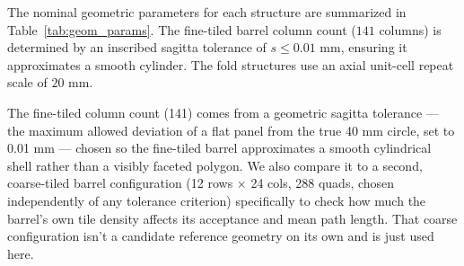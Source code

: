 \documentclass[a4paper,11pt]{article}
\begin{document}
The nominal geometric parameters for each structure are summarized in Table~\ref{tab:geom_params}. The fine-tiled barrel column count ($141$ columns) is determined by an inscribed sagitta tolerance of $s \le 0.01\text{ mm}$, ensuring it approximates a smooth cylinder. The fold structures use an axial unit-cell repeat scale of $20\text{ mm}$.

\begin{table}[!htbp]
\centering
\caption{Geometric parameters and material budget of the simulated structures at fixed $R = 40\text{ mm}$, $L = 120\text{ mm}$, $300\ \mu\text{m}$ Si, $50\ \mu\text{m}$ Kapton. Active area is the total mid-surface sensor area; $A_{\text{cyl}} = 2\pi R L = 301.59\text{ cm}^2$. Masses at $\rho_{\text{Si}} = 2.329\text{ g/cm}^3$, $\rho_{\text{Kapton}} = 1.420\text{ g/cm}^3$.}
\label{tab:geom_params}
\smallskip
{}
\end{table}
The fine-tiled column count (141) comes from a geometric sagitta tolerance --- the maximum allowed deviation of a flat panel from the true 40 mm circle, set to 0.01 mm --- chosen so the fine-tiled barrel approximates a smooth cylindrical shell rather than a visibly faceted polygon. We also compare it to a second, coarse-tiled barrel configuration (12 rows $\times$ 24 cols, 288 quads, chosen independently of any tolerance criterion) specifically to check how much the barrel's own tile density affects its acceptance and mean path length. That coarse configuration isn't a candidate reference geometry on its own and is just used here.
\end{document}

